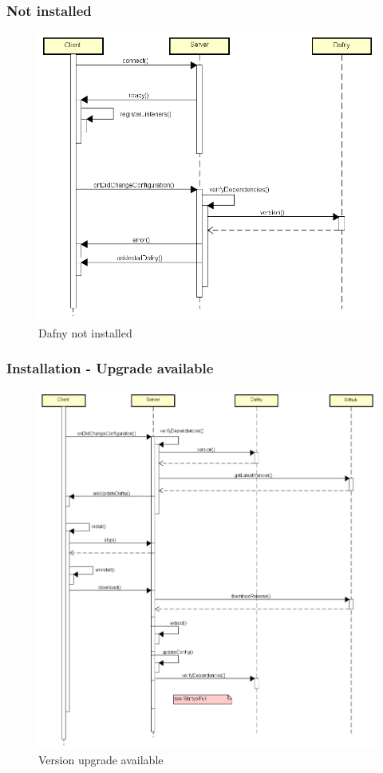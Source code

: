\subsubsection{Not installed}
\begin{figure}[H]
	\centering
	\includegraphics[width=1\textwidth]{img/DafnyNotInstalled}
	\caption{Dafny not installed}
	\label{fig:Dafny not installed}
\end{figure}

\subsubsection{Installation - Upgrade available}
\begin{figure}[H]
	\centering
	\includegraphics[width=1\textwidth]{img/DafnyVersionUpgrade}
	\caption{Version upgrade available}
	\label{fig:Version upgrade available}
\end{figure}



